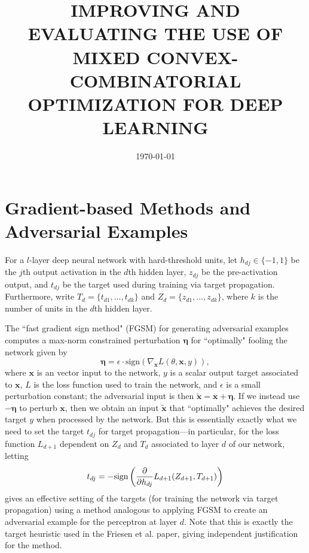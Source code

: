 \documentclass[12pt,letterpaper]{article}
\begin{document}
\title{\uppercase{\textbf{\normalsize Improving and Evaluating the Use of Mixed Convex-Combinatorial Optimization for Deep Learning}}}
\author{\small{\textsc{}}}
\date{\small{\textsc{\today}}}
\maketitle

\allowdisplaybreaks

\section{Gradient-based Methods and Adversarial Examples}

For a $l$-layer deep neural network with hard-threshold units, let $h_{dj} \in \{-1, 1\}$ be the $j$th output activation in the $d$th hidden layer, $z_{dj}$ be the pre-activation output, and $t_{dj}$ be the target used during training via target propagation. Furthermore, write $T_{d} = \{t_{d1}, \ldots, t_{dk}\}$ and $Z_{d} = \{z_{d1}, \ldots, z_{dk}\}$, where $k$ is the number of units in the $d$th hidden layer. 

The ``fast gradient sign method" (FGSM) for generating adversarial examples computes a max-norm constrained perturbation $\mathbf{\eta}$ for ``optimally" fooling the network given by
$$\mathbf{\eta} = \epsilon \cdot \textrm{sign}(\nabla_{\mathbf{x}}L(\theta, \mathbf{x}, y)),$$ 
where $\mathbf{x}$ is an vector input to the network, $y$ is a scalar output target associated to $\mathbf{x}$, $L$ is the loss function used to train the network, and $\epsilon$ is a small perturbation constant; the adversarial input is then $\tilde{\mathbf{x}} = \mathbf{x} + \mathbf{\eta}$. If we instead use $-\mathbf{\eta}$ to perturb $\mathbf{x}$, then we obtain an input $\tilde{\mathbf{x}}$ that ``optimally" achieves the desired target $y$ when processed by the network. But this is essentially exactly what we need to set the target $t_{dj}$ for target propagation---in particular, for the loss function $L_{d+1}$ dependent on $Z_{d}$ and $T_{d}$ associated to layer $d$ of our network, letting
$$t_{dj} = -\textrm{sign}\left({\partial \over \partial h_{dj}}L_{d+1}(Z_{d+1}, T_{d+1})\right)$$
gives an effective setting of the targets (for training the network via target propagation) using a method analogous to applying FGSM to create an adversarial example for the perceptron at layer $d$. Note that this is exactly the target heuristic used in the Friesen et al. paper, giving independent justification for the method. 
\end{document}
